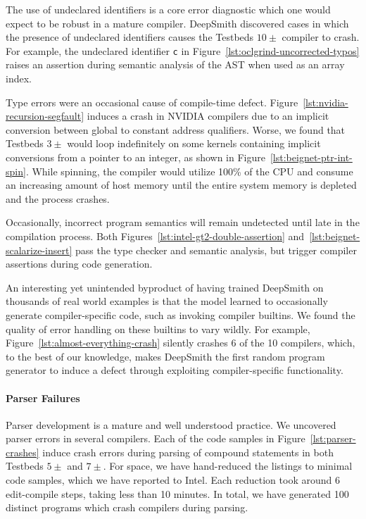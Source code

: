 The use of undeclared identifiers is a core error diagnostic which one would
expect to be robust in a mature compiler. DeepSmith discovered cases in which
the presence of undeclared identifiers causes the Testbeds $10\pm$ compiler to
crash. For example, the undeclared identifier \texttt{c} in
Figure~\ref{lst:oclgrind-uncorrected-typos} raises an assertion during semantic
analysis of the AST when used as an array index.

Type errors were an occasional cause of compile-time defect.
Figure~\ref{lst:nvidia-recursion-segfault} induces a crash in NVIDIA compilers
due to an implicit conversion between global to constant address qualifiers.
Worse, we found that Testbeds $3\pm$ would loop indefinitely on some kernels
containing implicit conversions from a pointer to an integer, as shown in
Figure~\ref{lst:beignet-ptr-int-spin}. While spinning, the compiler would
utilize 100\% of the CPU and consume an increasing amount of host memory until
the entire system memory is depleted and the process crashes.

Occasionally, incorrect program semantics will remain undetected until late in
the compilation process. Both Figures~\ref{lst:intel-gt2-double-assertion}
and~\ref{lst:beignet-scalarize-insert} pass the type checker and semantic
analysis, but trigger compiler assertions during code generation.

An interesting yet unintended byproduct of having trained DeepSmith on thousands
of real world examples is that the model learned to occasionally generate
compiler-specific code, such as invoking compiler builtins. We found the quality
of error handling on these builtins to vary wildly. For example,
Figure~\ref{lst:almost-everything-crash} silently crashes 6 of the 10 compilers,
which, to the best of our knowledge, makes DeepSmith the first random program
generator to induce a defect through exploiting compiler-specific functionality.

\paragraph{Parser Failures}

Parser development is a mature and well understood practice. We uncovered parser
errors in several compilers. Each of the code samples in
Figure~\ref{lst:parser-crashes} induce crash errors during parsing of compound
statements in both Testbeds $5\pm$ and $7\pm$. For space, we have hand-reduced
the listings to minimal code samples, which we have reported to Intel. Each
reduction took around 6 edit-compile steps, taking less than 10 minutes. In
total, we have generated 100 distinct programs which crash compilers during
parsing.

